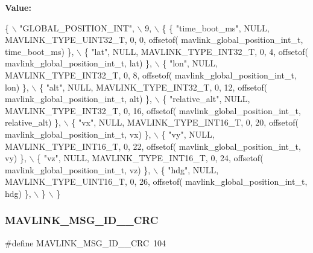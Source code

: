 {\bfseries Value\+:}
\begin{DoxyCode}
\{ \(\backslash\)
    \textcolor{stringliteral}{"GLOBAL\_POSITION\_INT"}, \(\backslash\)
    9, \(\backslash\)
    \{  \{ \textcolor{stringliteral}{"time\_boot\_ms"}, NULL, MAVLINK_TYPE_UINT32_T, 0, 0, offsetof(
      mavlink_global_position_int_t, time\_boot\_ms) \}, \(\backslash\)
         \{ \textcolor{stringliteral}{"lat"}, NULL, MAVLINK_TYPE_INT32_T, 0, 4, offsetof(
      mavlink_global_position_int_t, lat) \}, \(\backslash\)
         \{ \textcolor{stringliteral}{"lon"}, NULL, MAVLINK_TYPE_INT32_T, 0, 8, offsetof(
      mavlink_global_position_int_t, lon) \}, \(\backslash\)
         \{ \textcolor{stringliteral}{"alt"}, NULL, MAVLINK_TYPE_INT32_T, 0, 12, offsetof(
      mavlink_global_position_int_t, alt) \}, \(\backslash\)
         \{ \textcolor{stringliteral}{"relative\_alt"}, NULL, MAVLINK_TYPE_INT32_T, 0, 16, offsetof(
      mavlink_global_position_int_t, relative\_alt) \}, \(\backslash\)
         \{ \textcolor{stringliteral}{"vx"}, NULL, MAVLINK_TYPE_INT16_T, 0, 20, offsetof(
      mavlink_global_position_int_t, vx) \}, \(\backslash\)
         \{ \textcolor{stringliteral}{"vy"}, NULL, MAVLINK_TYPE_INT16_T, 0, 22, offsetof(
      mavlink_global_position_int_t, vy) \}, \(\backslash\)
         \{ \textcolor{stringliteral}{"vz"}, NULL, MAVLINK_TYPE_INT16_T, 0, 24, offsetof(
      mavlink_global_position_int_t, vz) \}, \(\backslash\)
         \{ \textcolor{stringliteral}{"hdg"}, NULL, MAVLINK_TYPE_UINT16_T, 0, 26, offsetof(
      mavlink_global_position_int_t, hdg) \}, \(\backslash\)
         \} \(\backslash\)
\}
\end{DoxyCode}
\mbox{\label{mavlink__msg__global__position__int_8h_a01da5ce2800649a28d816d909c8ff163}} 
\subsubsection{M\+A\+V\+L\+I\+N\+K\+\_\+\+M\+S\+G\+\_\+\+I\+D\+\_\+\_\+\+C\+RC}
{\footnotesize\ttfamily \#define M\+A\+V\+L\+I\+N\+K\+\_\+\+M\+S\+G\+\_\+\+I\+D\+\_\+\_\+\+C\+RC~104}

